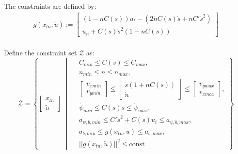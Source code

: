 The constraints are defined by:
\begin{align}
	g(x_{tn}, \tilde{u}) :=
	\begin{bmatrix}
		(1 - nC(s)) u_t - (2\dot{n}C(s)\dot{s} + nC' \dot{s}^2) \\
		u_n + C(s) \dot{s}^2 (1 - nC(s))
	\end{bmatrix}
\end{align}
\\
Define the constraint set $\mathcal{Z}$ as:
\begin{equation}
	\mathcal{Z} = \left\{
	\begin{bmatrix} x_{tn} \\ \tilde{u} \end{bmatrix} \; \middle|\;
	\begin{aligned}
		 & C_{min} \leq C(s) \leq C_{max},                                                                                                                                              \\
		 & n_{min} \leq n \leq n_{max},                                                                                                                                                 \\
		 & \begin{bmatrix} v_{xmin} \\ v_{ymin} \end{bmatrix} \leq \begin{bmatrix} \dot{s}(1 + nC(s)) \\ \dot{n} \end{bmatrix} \leq \begin{bmatrix} v_{ymax} \\ v_{xmax} \end{bmatrix}, \\
		 & \dot{\psi}_{min} \leq C(s) \dot{s} \leq \dot{\psi}_{max},                                                                                                                    \\
		 & a_{\psi,b,min} \leq C' \dot{s}^2 + C(s) u_t \leq a_{\psi,b,max},                                                                                                             \\
		 & a_{b,min} \leq g(x_{tn}, \tilde{u}) \leq a_{b,max},                                                                                                                          \\
		 & ||g(x_{tn}, \tilde{u})||^2 \leq \text{const}
	\end{aligned}
	\right\}
\end{equation}


